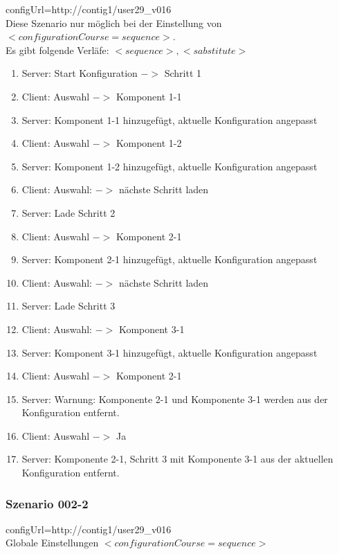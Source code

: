 \documentclass{article}
\begin{document}
configUrl=http://contig1/user29\_v016\\

Diese Szenario nur m\"oglich bei der Einstellung von
$<configurationCourse=sequence>$.\\

\noindent Es gibt folgende Verl\"afe: $<sequence>, <sabstitute>$

\begin{enumerate}
  \item Server: Start Konfiguration $->$ Schritt 1
  \item Client: Auswahl $->$ Komponent 1-1
  \item Server: Komponent 1-1 hinzugef\"ugt, aktuelle Konfiguration angepasst
  \item Client: Auswahl $->$ Komponent 1-2
  \item Server: Komponent 1-2 hinzugef\"ugt, aktuelle Konfiguration angepasst
  \item Client: Auswahl: $->$ n\"achste Schritt laden
  \item Server: Lade Schritt 2
  \item Client: Auswahl $->$ Komponent 2-1
  \item Server: Komponent 2-1 hinzugef\"ugt, aktuelle Konfiguration angepasst
  \item Client: Auswahl: $->$ n\"achste Schritt laden
  \item Server: Lade Schritt 3
  \item Client: Auswahl: $->$ Komponent 3-1
  \item Server: Komponent 3-1 hinzugef\"ugt, aktuelle Konfiguration angepasst
  \item Client: Auswahl $->$ Komponent 2-1
  \item Server: Warnung: Komponente 2-1 und Komponente 3-1 werden aus der
  Konfiguration entfernt.
  \item Client: Auswahl $->$ Ja
  \item Server: Komponente 2-1, Schritt 3 mit Komponente 3-1 aus der aktuellen
  Konfiguration entfernt.
\end{enumerate}

\subsubsection{Szenario 002-2}

configUrl=http://contig1/user29\_v016\\

Globale Einstellungen $<configurationCourse=sequence>$
\end{document}
